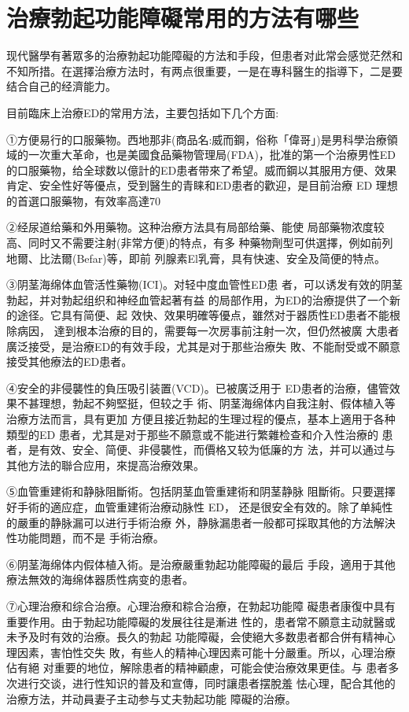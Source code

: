 \documentclass[12pt,UTF8]{ctexbook}
\begin{document}
\section{治療勃起功能障礙常用的方法有哪些}

现代醫學有著眾多的治療勃起功能障礙的方法和手段，但患者对此常会感觉茫然和不知所措。在選擇治療方法时，有两点很重要，一是在專科醫生的指導下，二是要结合自己的经濟能力。

目前臨床上治療ED的常用方法，主要包括如下几个方面:

①方便易行的口服藥物。西地那非(商品名:威而鋼，俗称「偉哥」)是男科學治療領域的一次重大革命，也是美國食品藥物管理局(FDA)，批准的第一个治療男性ED的口服藥物，给全球数以億計的ED患者带來了希望。威而鋼以其服用方便、效果肯定、安全性好等優点，受到醫生的青睐和ED患者的歡迎，是目前治療 ED 理想的首選口服藥物，有效率高達70%

②经尿道给藥和外用藥物。这种治療方法具有局部给藥、能使
局部藥物浓度较高、同时又不需要注射(非常方便)的特点，有多
种藥物劑型可供選擇，例如前列地爾、比法爾(Befar)等，即前
列腺素El乳膏，具有快速、安全及简便的特点。

③阴茎海绵体血管活性藥物(ICI)。对轻中度血管性ED患
者，可以诱发有效的阴茎勃起，并对勃起组织和神经血管起著有益
的局部作用，为ED的治療提供了一个新的途径。它具有简便、起
效快、效果明確等優点，雖然对于器质性ED患者不能根除病因，
達到根本治療的目的，需要每一次房事前注射一次，但仍然被廣
大患者廣泛接受，是治療ED的有效手段，尤其是对于那些治療失
敗、不能耐受或不願意接受其他療法的ED患者。

④安全的非侵襲性的負压吸引装置(VCD)。已被廣泛用于
ED患者的治療，儘管效果不甚理想，勃起不夠堅挺，但较之手
術、阴茎海绵体内自我注射、假体植入等治療方法而言，具有更加
方便且接近勃起的生理过程的優点，基本上適用于各种類型的ED
患者，尤其是对于那些不願意或不能进行繁雜检查和介入性治療的
患者，是有效、安全、简便、非侵襲性，而價格又较为低廉的方
法，并可以通过与其他方法的聯合应用，來提高治療效果。

⑤血管重建術和静脉阻斷術。包括阴茎血管重建術和阴茎静脉
阻斷術。只要選擇好手術的適应症，血管重建術治療动脉性 ED，
还是很安全有效的。除了单純性的嚴重的静脉漏可以进行手術治療
外，静脉漏患者一般都可採取其他的方法解決性功能問題，而不是
手術治療。

⑥阴茎海绵体内假体植入術。是治療嚴重勃起功能障礙的最后
手段，適用于其他療法無效的海绵体器质性病变的患者。

⑦心理治療和综合治療。心理治療和粽合治療，在勃起功能障
礙患者康復中具有重要作用。由于勃起功能障礙的发展往往是漸进
性的，患者常不願意主动就醫或未予及时有效的治療。長久的勃起
功能障礙，会使絕大多数患者都合併有精神心理因素，害怕性交失
敗，有些人的精神心理因素可能十分嚴重。所以，心理治療佔有絕
对重要的地位，解除患者的精神顧慮，可能会使治療效果更佳。与
患者多次进行交谈，进行性知识的普及和宣傳，同时讓患者摆脫羞
怯心理，配合其他的治療方法，并动員妻子主动参与丈夫勃起功能
障礙的治療。
\end{document}
